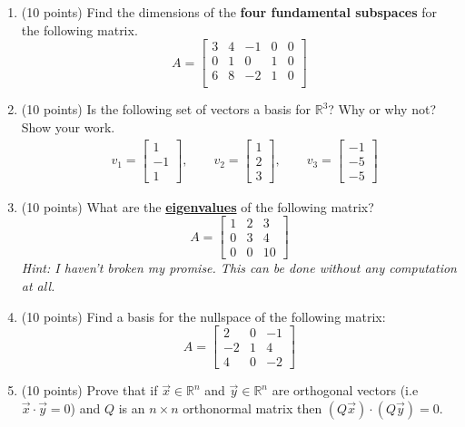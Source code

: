 \documentclass[12pt, a4paper]{article}
\theoremstyle{break}
\begin{document}
\begin{enumerate}
\item (10 points) Find the dimensions of the \textbf{four fundamental subspaces} for the following matrix.
\begin{equation}
A=\begin{bmatrix}
3 & 4 &-1&0 & 0\\
0 & 1 & 0 & 1 & 0\\
6 & 8 &-2 &1& 0 \\
\end{bmatrix} \nonumber
\end{equation}
\newpage

\item (10 points)  Is the following set of vectors a basis for $\mathbb{R}^3$? Why or why not? Show your work. 
\begin{align}
& v_1=\begin{bmatrix} 1 \\ -1 \\ 1 \end{bmatrix}, \qquad v_2=\begin{bmatrix} 1 \\ 2 \\ 3 \end{bmatrix} , \qquad v_3=\begin{bmatrix} -1 \\ -5\\-5 \end{bmatrix} \nonumber
\end{align}
\newpage

\item (10 points) What are the \textbf{\underline{eigenvalues}}  of the following matrix? 
\begin{equation}
A=
\begin{bmatrix}
1 & 2 & 3 \\
0  & 3 & 4 \\
0 & 0 & 10 
\end{bmatrix} \nonumber
\end{equation}
\textit{Hint: I haven't broken my promise. This can be done without any computation at all. }
\newpage

\item (10 points) Find a basis for the nullspace of the following matrix:
\begin{equation}
A=
\begin{bmatrix}
2 & 0 & -1 \\
-2 & 1 & 4 \\
4& 0 & -2  
\end{bmatrix} \nonumber
\end{equation}
\newpage

\item (10 points) Prove that if $\vec{x} \in \mathbb{R}^n$ and $\vec{y}\in \mathbb{R}^n$ are orthogonal vectors (i.e $\vec{x} \cdot \vec{y}=0$) and $Q$ is an $n \times n$ orthonormal matrix then  $(Q\vec{x}) \cdot (Q\vec{y})=0$. 
\newpage








\end{enumerate}
\end{document}
